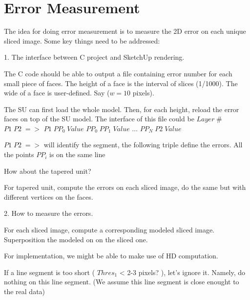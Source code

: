\documentclass[12pt,letterpaper]{article}
\begin{document}
\section{Error Measurement}

The idea for doing error measurement is to measure the 2D error on each unique sliced
image. Some key things need to be addressed:\newline


1. The interface between C project and SketchUp rendering. \newline

The C code should be able to output a file containing error number for each small piece of faces.
The height of a face is the interval of slices (1/1000). The wide of a face is user-defined.
Say ($w = 10$ pixels).

The SU can first load the whole model. Then, for each height, reload the error faces on top of the
SU model. The interface of this file could be \newline
$Layer \; \#$ \newline
$P1 \; P2 \; =>$ \newline
$P1 \; PP_0 \; Value$ \newline
$PP_0 \; PP_1 \; Value$ \newline 
$\ldots$ \newline
$PP_N \; P2 \; Value$ \newline 

$P1 \; P2 \; =>$ will identify the segment, the following triple define the errors. All the points $PP_i$
is on the same line \newline


How about the tapered unit?

For tapered unit, compute the errors on each sliced image, do the same but with different 
vertices on the faces. \newline \newline

2. How to measure the errors. \newline

For each sliced image, compute a corresponding modeled sliced image. Superposition the 
modeled on on the sliced one. 

For implementation, we might be able to make use of HD computation.

If a line segment is too short ( $Thres_1$ < 2-3 pixels? ), let's ignore it. Namely, do
nothing on this line segment. (We assume this line segment is close enought to the real data)
\end{document}
